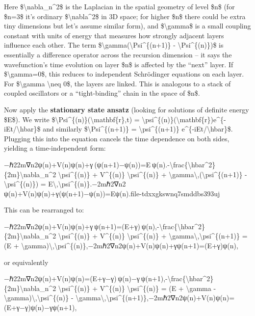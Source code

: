 Here \$\textbackslash{}nabla\_n\^{}2\$ is the Laplacian in the spatial
geometry of level \$n\$ (for \$n=3\$ it's ordinary
\$\textbackslash{}nabla\^{}2\$ in 3D space; for higher \$n\$ there could
be extra tiny dimensions but let's assume similar form), and
\$\textbackslash{}gamma\$ is a small coupling constant with units of
energy that measures how strongly adjacent layers influence each other​.
The term \$\textbackslash{}gamma(\textbackslash{}Psi\^{}\{(n+1)\} -
\textbackslash{}Psi\^{}\{(n)\})\$ is essentially a difference operator
across the recursion dimension -- it says the wavefunction's time
evolution on layer \$n\$ is affected by the ``next'' layer. If
\$\textbackslash{}gamma=0\$, this reduces to independent Schrödinger
equations on each layer. For \$\textbackslash{}gamma \textbackslash{}neq
0\$, the layers are linked. This is analogous to a stack of coupled
oscillators or a ``tight-binding'' chain in the space of \$n\$​.

Now apply the \textbf{stationary state ansatz} (looking for solutions of
definite energy \$E\$). We write
\$\textbackslash{}Psi\^{}\{(n)\}(\textbackslash{}mathbf\{r\},t) =
\textbackslash{}psi\^{}\{(n)\}(\textbackslash{}mathbf\{r\})e\^{}\{-iEt/\textbackslash{}hbar\}\$
and similarly \$\textbackslash{}Psi\^{}\{(n+1)\} =
\textbackslash{}psi\^{}\{(n+1)\} e\^{}\{-iEt/\textbackslash{}hbar\}\$​.
Plugging this into the equation cancels the time dependence on both
sides, yielding a time-independent form:

−ℏ22m∇n2ψ(n)+V(n)ψ(n)+γ (ψ(n+1)−ψ(n))=E ψ(n).-\textbackslash{}frac\{\textbackslash{}hbar\^{}2\}\{2m\}\textbackslash{}nabla\_n\^{}2
\textbackslash{}psi\^{}\{(n)\} + V\^{}\{(n)\}
\textbackslash{}psi\^{}\{(n)\} +
\textbackslash{}gamma\textbackslash{},(\textbackslash{}psi\^{}\{(n+1)\}
- \textbackslash{}psi\^{}\{(n)\}) =
E\textbackslash{},\textbackslash{}psi\^{}\{(n)\}.−2mℏ2​∇n2​ψ(n)+V(n)ψ(n)+γ(ψ(n+1)−ψ(n))=Eψ(n).​file-tdxxgkswnq7smddbs393uj​

This can be rearranged to:

−ℏ22m∇n2ψ(n)+V(n)ψ(n)+γ ψ(n+1)=(E+γ) ψ(n),-\textbackslash{}frac\{\textbackslash{}hbar\^{}2\}\{2m\}\textbackslash{}nabla\_n\^{}2
\textbackslash{}psi\^{}\{(n)\} + V\^{}\{(n)\}
\textbackslash{}psi\^{}\{(n)\} +
\textbackslash{}gamma\textbackslash{},\textbackslash{}psi\^{}\{(n+1)\} =
(E +
\textbackslash{}gamma)\textbackslash{},\textbackslash{}psi\^{}\{(n)\},−2mℏ2​∇n2​ψ(n)+V(n)ψ(n)+γψ(n+1)=(E+γ)ψ(n),

or equivalently

−ℏ22m∇n2ψ(n)+V(n)ψ(n)=(E+γ−γ) ψ(n)−γ ψ(n+1),-\textbackslash{}frac\{\textbackslash{}hbar\^{}2\}\{2m\}\textbackslash{}nabla\_n\^{}2
\textbackslash{}psi\^{}\{(n)\} + V\^{}\{(n)\}
\textbackslash{}psi\^{}\{(n)\} = (E + \textbackslash{}gamma -
\textbackslash{}gamma)\textbackslash{},\textbackslash{}psi\^{}\{(n)\} -
\textbackslash{}gamma\textbackslash{},\textbackslash{}psi\^{}\{(n+1)\},−2mℏ2​∇n2​ψ(n)+V(n)ψ(n)=(E+γ−γ)ψ(n)−γψ(n+1),


